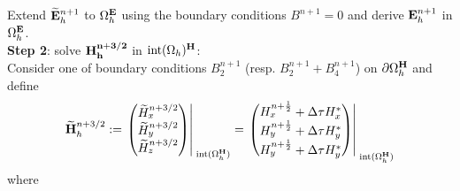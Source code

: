\documentclass[12pt,reqno]{amsart}
\newcommand{\e}{{\bf E}}
\newcommand{\h}{{\bf H}}
\theoremstyle{definition}
\numberwithin{equation}{section}
\newcommand{\intr}[1]{\mathrm{int}(#1)}
\def\Gwh{\Omega_h}
\begin{document}
	Extend $\widetilde{\e}_h^{n+1}$
to $\Gwh^\e$ using the boundary conditions $B^{n+1}=0$ and derive 
$\e_h^{n+1}$ in $\Gwh^\e$. 
	\\[2mm]
	{\bf Step 2}: solve $\bf{H}^{n+3/2}_h$ in $\intr\Gwh^\h$: \\[2mm]
	Consider one of  boundary conditions $B_2^{n+1}$ (resp. $B_2^{n+1}+B_4^{n+1}$) on
 $\partial \Gwh^\h$
and define
	$$
	\widetilde{\h}_h^{n+3/2}:=
	\left.
	\begin{pmatrix}
		\widetilde{H}_x^{n+3/2}\\
		\widetilde{H}_y^{n+3/2}\\
		\widetilde{H}_z^{n+3/2}
	\end{pmatrix}\right|_{\; \intr{\Gwh^{\h}}}^{\;}=
\left.
	\begin{pmatrix}
		H_x^{n+\frac{1}{2}}+\Delta \tau H_x^{*}\\
		H_y^{n+\frac{1}{2}}+\Delta \tau H_y^{*}\\
		H_y^{n+\frac{1}{2}}+\Delta \tau H_y^{*}
	\end{pmatrix}\right|_{\; \intr{\Gwh^{\h}}}^{\;}
	$$
	where 
\end{document}
